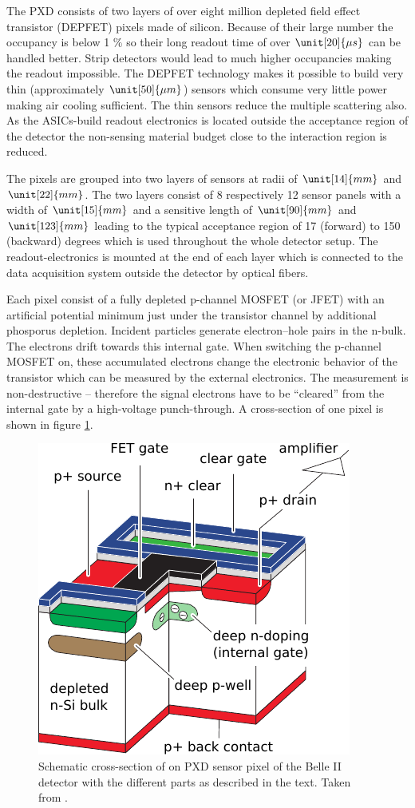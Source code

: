 The PXD consists of two layers of over eight million depleted field effect transistor (DEPFET) pixels made of silicon. Because of their large number the occupancy is below 1 \% so their long readout time of over $\unit[20]{\mu s}$ can be handled better. Strip detectors would lead to much higher occupancies making the readout impossible.
The DEPFET technology makes it possible to build very thin (approximately $\unit[50]{\mu m}$) sensors which consume very little power making air cooling sufficient. The thin sensors reduce the multiple scattering also. As the ASICs-build readout electronics is located outside the acceptance region of the detector the non-sensing material budget close to the interaction region is reduced.

The pixels are grouped into two layers of sensors at radii of $\unit[14]{mm}$ and $\unit[22]{mm}$. The two layers consist of 8 respectively 12 sensor panels with a width of $\unit[15]{mm}$ and a sensitive length of $\unit[90]{mm}$ and $\unit[123]{mm}$ leading to the typical acceptance region of 17 (forward) to 150 (backward) degrees which is used throughout the whole detector setup. The readout-electronics is mounted at the end of each layer which is connected to the data acquisition system outside the detector by optical fibers.

Each pixel consist of a fully depleted p-channel MOSFET (or JFET) with an artificial potential minimum just under the transistor channel by additional phosporus depletion. Incident particles generate electron--hole pairs in the n-bulk. The electrons drift towards this internal gate. When switching the p-channel MOSFET on, these accumulated electrons change the electronic behavior of the transistor which can be measured by the external electronics. The measurement is non-destructive -- therefore the signal electrons have to be ``cleared'' from the internal gate by a high-voltage punch-through. A cross-section of one pixel is shown in figure \ref{fig-pxd-schema}.

\begin{figure}
  \centering
  \includegraphics[width=0.6\linewidth]{figures/experimental_setup/pxd.pdf}
  \caption[Cross-section of a PXD sensor]{Schematic cross-section of on PXD sensor pixel of the Belle II detector with the different parts as described in the text. Taken from \cite{tdr}.}
  \label{fig-pxd-schema}
\end{figure}


